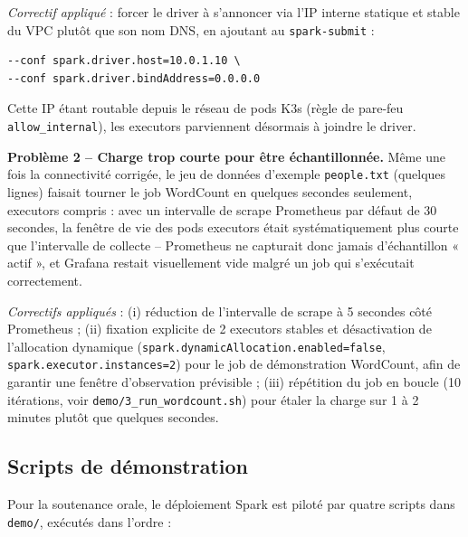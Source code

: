\documentclass{name}
\begin{document}
\emph{Correctif appliqué} : forcer le driver à s'annoncer via l'IP interne statique et stable du VPC plutôt que son nom DNS, en ajoutant au \texttt{spark-submit} :
\begin{lstlisting}[basicstyle=\ttfamily\small]
--conf spark.driver.host=10.0.1.10 \
--conf spark.driver.bindAddress=0.0.0.0
\end{lstlisting}
Cette IP étant routable depuis le réseau de pods K3s (règle de pare-feu \texttt{allow\_internal}), les executors parviennent désormais à joindre le driver.

\textbf{Problème 2 -- Charge trop courte pour être échantillonnée.} Même une fois la connectivité corrigée, le jeu de données d'exemple \texttt{people.txt} (quelques lignes) faisait tourner le job WordCount en quelques secondes seulement, executors compris : avec un intervalle de scrape Prometheus par défaut de 30 secondes, la fenêtre de vie des pods executors était systématiquement plus courte que l'intervalle de collecte -- Prometheus ne capturait donc jamais d'échantillon « actif », et Grafana restait visuellement vide malgré un job qui s'exécutait correctement.

\emph{Correctifs appliqués} : (i) réduction de l'intervalle de scrape à 5 secondes côté Prometheus ; (ii) fixation explicite de 2 executors stables et désactivation de l'allocation dynamique (\texttt{spark.dynamicAllocation.enabled=false}, \texttt{spark.executor.instances=2}) pour le job de démonstration WordCount, afin de garantir une fenêtre d'observation prévisible ; (iii) répétition du job en boucle (10 itérations, voir \texttt{demo/3\_run\_wordcount.sh}) pour étaler la charge sur 1 à 2 minutes plutôt que quelques secondes.

\subsection{Scripts de démonstration}

Pour la soutenance orale, le déploiement Spark est piloté par quatre scripts dans \texttt{demo/}, exécutés dans l'ordre :
\end{document}
